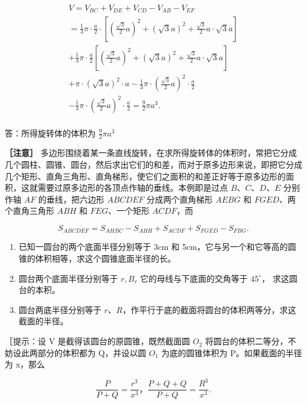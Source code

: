 \[
\begin{array}{l} V = V _ {B C} + V _ {D E} + V _ {C D} - V _ {A B} - V _ {E F} \\ = \frac {1}{3} \pi \cdot \frac {a}{2} \cdot \left[ \left(\frac {\sqrt {3}}{2} a\right) ^ {2} + \left(\sqrt {3} a\right) ^ {2} + \frac {\sqrt {3}}{2} a \cdot \sqrt {3} a \right] \\ + \frac {1}{3} \pi \cdot \frac {a}{2} \left[ \left(\frac {\sqrt {3}}{2} a\right) ^ {2} + \left(\sqrt {3} a\right) ^ {2} + \frac{\sqrt{3}}{2} a \cdot \sqrt{3} a \right] \\ + \pi \cdot \left(\sqrt {3} a\right) ^ {2} \cdot a - \frac {1}{3} \pi \cdot \left(\frac {\sqrt {3}}{2} a\right) ^ {2} \cdot \frac {a}{2} \\ - \frac {1}{3} \pi \cdot \left(\frac {\sqrt {3}}{2} a\right) ^ {2} \cdot \frac {a}{2} = \frac {9}{2} \pi a ^ {3}. \\ \end{array}
\]

答：所得旋转体的体积为 \(\frac{9}{2}\pi a^3\)

\textbf{［注意］}
多边形围绕着某一条直线旋转，在求所得旋转体的体积时，常把它分成几个圆柱、圆锥、圆台，然后求出它们的和差，而对于原多边形来说，即把它分成几个矩形、直角三角形、直角梯形，使它们之面积的和差正好等于原多边形的面积，这就需要过原多边形的各顶点作轴的垂线。本例即是过点
\(B\)、\(C\)、\(D\)、\(E\) 分别作轴 \(AF\) 的垂线，把六边形 \(ABCDEF\)
分成两个直角梯形 \(AEBG\) 和 \(FGED\)、两个直角三角形 \(ABH\) 和
\(FEG\)、一个矩形 \(ACDF\)，而

\[
S _ {A B C D E F} = S _ {A H B C} - S _ {A B H} + S _ {A C D F} + S _ {F G E D} - S _ {F B G}.
\]

\begin{enumerate}
\item
  已知一圆台的两个底面半径分别等于 3cm 和
  5cm，它与另一个和它等高的圆锥的体积相等，求这个圆锥底面半径的长。
\item
  圆台两个底面半径分别等于 \(r, B_{r}\) 它的母线与下底面的交角等于
  \(45^{\circ}\)， 求这圆台的本积。
\item
  圆台两底半径分别等于
  \(r\)、\(R\)，作平行于底的截面将圆台的体积两等分，求这截面的半径。
\end{enumerate}

［提示：设 V 是截得该圆台的原圆锥，既然截面圆 \(O_{2}\)
将圆台的体积二等分，不妨设此两部分的体积都为 Q，并设以圆 \(O_{1}\)
为底的圆锥体积为 P。如果截面的半径为 x，那么

\[
\frac {P}{P + Q} = \frac {r ^ {3}}{x ^ {3}}\text{，} \frac {P + Q + Q}{P + Q} = \frac {R ^ {3}}{x ^ {3}}.
\]

